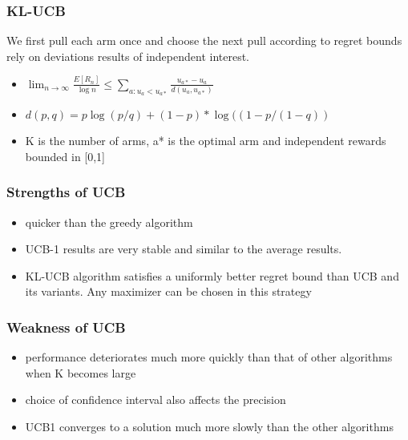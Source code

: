 \documentclass{beamer}
\begin{document}
    \begin{frame}
        \frametitle{KL-UCB}
        We first pull each arm once and choose the next pull according to regret bounds rely on deviations results of independent interest.

        \begin{itemize}
            \item<1->$\lim_{n\to \infty} \frac{E[R_n]}{\log n} \leq  \sum_{a:u_a < u_{a*}} \frac{u_{a*}-u_a}{d(u_a,u_{a*})}  $
            \item<2->  $d(p, q) = p \log(p/q) + (1 - p) * \log((1 - p/(1 - q))$
            \item<3->  K is the number of arms, a* is the optimal arm and independent rewards bounded in [0,1]
        \end{itemize}
    \end{frame}

    \begin{frame}
        \frametitle{Strengths of UCB}

        \begin{itemize}
            \item<1-> quicker than the greedy algorithm
            \item<2->  UCB-1 results are very stable and similar to the average results.
            \item<3->   KL-UCB algorithm satisfies a uniformly better regret bound than UCB and its variants. Any maximizer can be chosen in this strategy
        \end{itemize}
    \end{frame}

    \begin{frame}
        \frametitle{Weakness of UCB}

        \begin{itemize}
            \item<1->  performance deteriorates much more quickly than that of other algorithms when K becomes large
            \item<2->  choice of confidence interval also affects the precision
            \item<3->  UCB1 converges to a solution much more slowly than the other algorithms
        \end{itemize}
    \end{frame}
\end{document}
